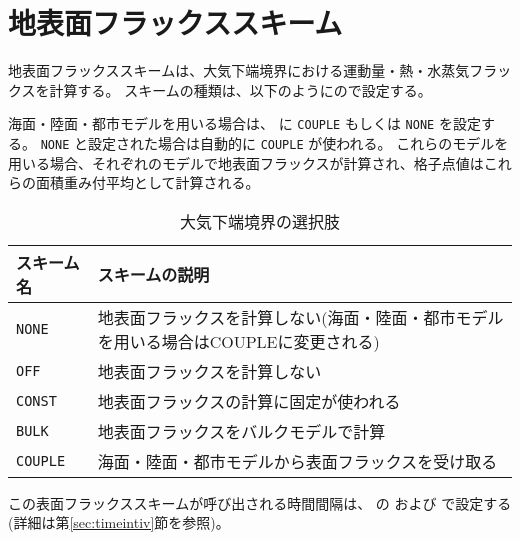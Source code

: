 \section{地表面フラックススキーム}
\label{sec:basic_usel_surface}
地表面フラックススキームは、大気下端境界における運動量・熱・水蒸気フラックスを計算する。
スキームの種類は、以下のようにので設定する。

海面・陸面・都市モデルを用いる場合は、 に \verb|COUPLE| もしくは \verb|NONE| を設定する。
\verb|NONE| と設定された場合は自動的に \verb|COUPLE| が使われる。
これらのモデルを用いる場合、それぞれのモデルで地表面フラックスが計算され、格子点値はこれらの面積重み付平均として計算される。

\begin{table}[h]
\begin{center}
  \caption{大気下端境界の選択肢}
  \label{tab:nml_atm_sf}
  \begin{tabularx}{150mm}{lX} \hline
    \rowcolor[gray]{0.9}  スキーム名 & スキームの説明\\ \hline
      \verb|NONE|         & 地表面フラックスを計算しない(海面・陸面・都市モデルを用いる場合はCOUPLEに変更される) \\
      \verb|OFF|          & 地表面フラックスを計算しない \\
      \verb|CONST|        & 地表面フラックスの計算に固定が使われる \\
      \verb|BULK|         & 地表面フラックスをバルクモデルで計算 \\
      \verb|COUPLE|       & 海面・陸面・都市モデルから表面フラックスを受け取る \\
    \hline
  \end{tabularx}
\end{center}
\end{table}

この表面フラックススキームが呼び出される時間間隔は、
 の  および  で設定する(詳細は第\ref{sec:timeintiv}節を参照)。


